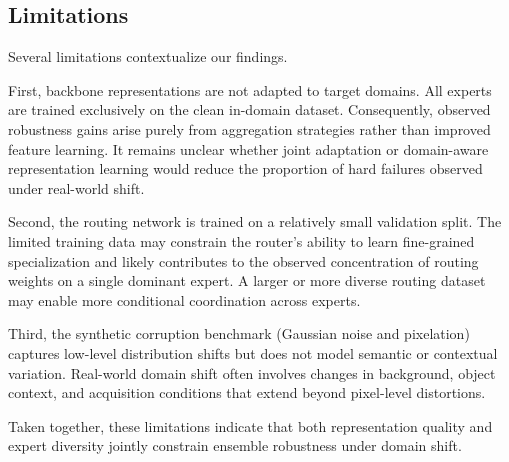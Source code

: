 \subsection{Limitations}
Several limitations contextualize our findings.

First, backbone representations are not adapted to target domains.
All experts are trained exclusively on the clean in-domain dataset.
Consequently, observed robustness gains arise purely from aggregation strategies rather than improved feature learning.
It remains unclear whether joint adaptation or domain-aware representation learning would reduce the proportion of hard failures observed under real-world shift.

Second, the routing network is trained on a relatively small validation split.
The limited training data may constrain the router’s ability to learn fine-grained specialization and likely contributes to the observed concentration of routing weights on a single dominant expert.
A larger or more diverse routing dataset may enable more conditional coordination across experts.

Third, the synthetic corruption benchmark (Gaussian noise and pixelation) captures low-level distribution shifts but does not model semantic or contextual variation.
Real-world domain shift often involves changes in background, object context, and acquisition conditions that extend beyond pixel-level distortions.

Taken together, these limitations indicate that both representation quality and expert diversity jointly constrain ensemble robustness under domain shift.